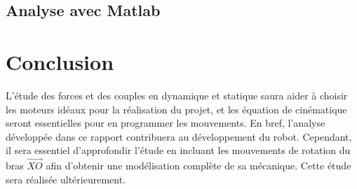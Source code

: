 \documentclass{udes_rapport} %
\begin{document}
\subsection{Analyse avec Matlab}

\section{Conclusion}

L'étude des forces et des couples en dynamique et statique saura aider à choisir les moteurs idéaux pour la réalisation du projet, et les équation de cinématique seront essentielles pour en programmer les mouvements. En bref, l'analyse développée dans ce rapport contribuera au développement du robot. Cependant, il sera essentiel d'approfondir l'étude en incluant les mouvements de rotation du bras $\overrightarrow{XO}$ afin d'obtenir une modélisation complète de sa mécanique. Cette étude sera réalisée ultérieurement.

\begin{comment}
\begin{center}
	\centering
	\texttt{[image: puissance]}
	\captionof{figure}{Spectre de puissance d'une onde de 1kHz}
	\label{puissance}
\end{center}


\section{Filtres FIR}
\noindent\begin{minipage}{\textwidth} 
\begin{minipage}{0.5\textwidth}
  \centering
  \texttt{[image: ampFIR]}
  \captionof{subfigure}{Amplitude}
  \label{FIR:ampFIR}
\end{minipage}%
\begin{minipage}{0.5\textwidth}
  \centering 
  \texttt{[image: phaseCute]} 
  \captionof{subfigure}{Phase} 
  \label{FIR:phaseFIR} 
\end{minipage} 
\captionof{figure}{Filtre IIR} 
\label{FIR} 
\end{minipage}
\end{comment}
\end{document}
